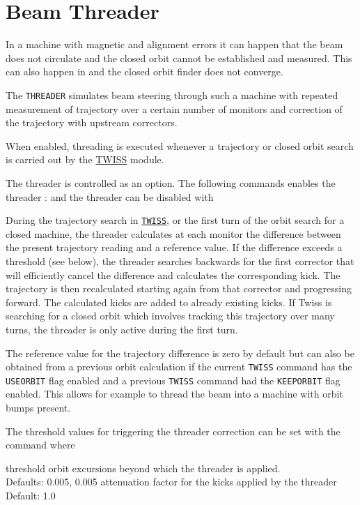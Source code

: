 %

\section{Beam Threader}
\label{sec:threader}

In a machine with magnetic and alignment errors it can happen that the
beam does not circulate and the closed orbit cannot be established and
measured. This can also happen in \madx and the closed orbit finder does
not converge. 

The {\tt THREADER} simulates beam steering through such a machine
with repeated measurement of trajectory over a certain number of
monitors and correction of the trajectory with upstream correctors.   

When enabled, threading is executed whenever a trajectory or closed
orbit search is carried out by the \hyperref[chap:twiss]{TWISS}
module.   

The threader is controlled as an option. 
The following \madx commands enables the threader :
and the threader can be disabled with

During the trajectory search in \hyperref[sec:twiss]{\tt TWISS}, or the first 
turn of the orbit search for a closed machine, the threader calculates at each
monitor the difference between the present trajectory reading and a
reference value.
If the difference exceeds a threshold (see below), the threader searches
backwards for the first corrector that will efficiently cancel the
difference and calculates the corresponding kick. The trajectory is then
recalculated starting again from that corrector and progressing
forward. The calculated kicks are added to already existing kicks. If
Twiss is searching for a closed orbit which involves tracking this
trajectory over many turns, the threader is only active during the first
turn.  

The reference value for the trajectory difference is zero by default but
can also be obtained from a previous orbit calculation if the current
{\tt TWISS} command has the {\tt USEORBIT} flag enabled and a previous
{\tt TWISS} command had the {\tt KEEPORBIT} flag enabled. This allows
for example to thread the beam into a machine with orbit bumps present.  

The threshold values for triggering the threader correction can be set
with the command  
where 
\begin{madlist}
   threshold orbit excursions beyond which the threader
  is applied. \\ Defaults: 0.005, 0.005
   attenuation factor for the kicks applied by the threader
  \\ Default: 1.0 
\end{madlist}

